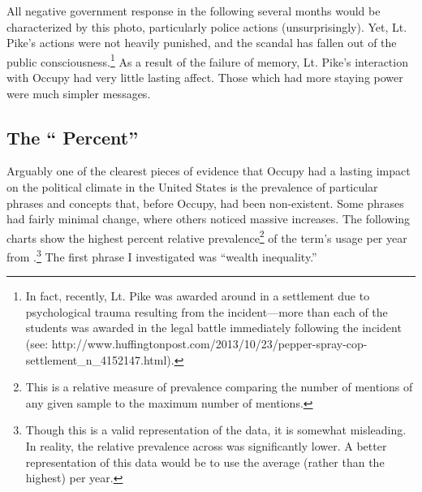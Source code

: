 \documentclass{article}
\begin{document}
All negative government response in the following several months would be characterized by this photo, particularly police actions (unsurprisingly).
Yet, Lt. Pike's actions were not heavily punished, and the scandal has fallen out of the public consciousness.\footnote{In fact, recently, Lt. Pike was awarded around  in a settlement due to psychological trauma resulting from the incident---more than each of the students was awarded in the legal battle immediately following the incident (see: http://www.huffingtonpost.com/2013/10/23/pepper-spray-cop-settlement\_n\_4152147.html).}
As a result of the failure of memory, Lt. Pike's interaction with Occupy had very little lasting affect.
Those which had more staying power were much simpler messages.

\subsection{The `` Percent''}
Arguably one of the clearest pieces of evidence that Occupy had a lasting impact on the political climate in the United States is the prevalence of particular phrases and concepts that, before Occupy, had been non-existent.
Some phrases had fairly minimal change, where others noticed massive increases.
The following charts show the highest percent relative prevalence\footnote{This is a relative measure of prevalence comparing the number of mentions of any given sample to the maximum number of mentions.} of the term's usage per year from .\footnote{Though this is a valid representation of the data, it is somewhat misleading. In reality, the relative prevalence across  was significantly lower. A better representation of this data would be to use the average (rather than the highest) per year.}
The first phrase I investigated was ``wealth inequality.''


\end{document}
